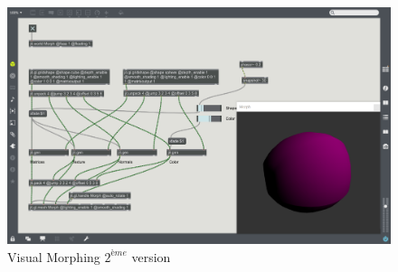    \begin{figure}
        \centering
        \includegraphics[width = \textwidth ]{Graphs/ShapeMorphing1.png}
        \caption{Visual Morphing $2^{ème}$ version}
        \label{VisualMorph2}
    \end{figure} 

